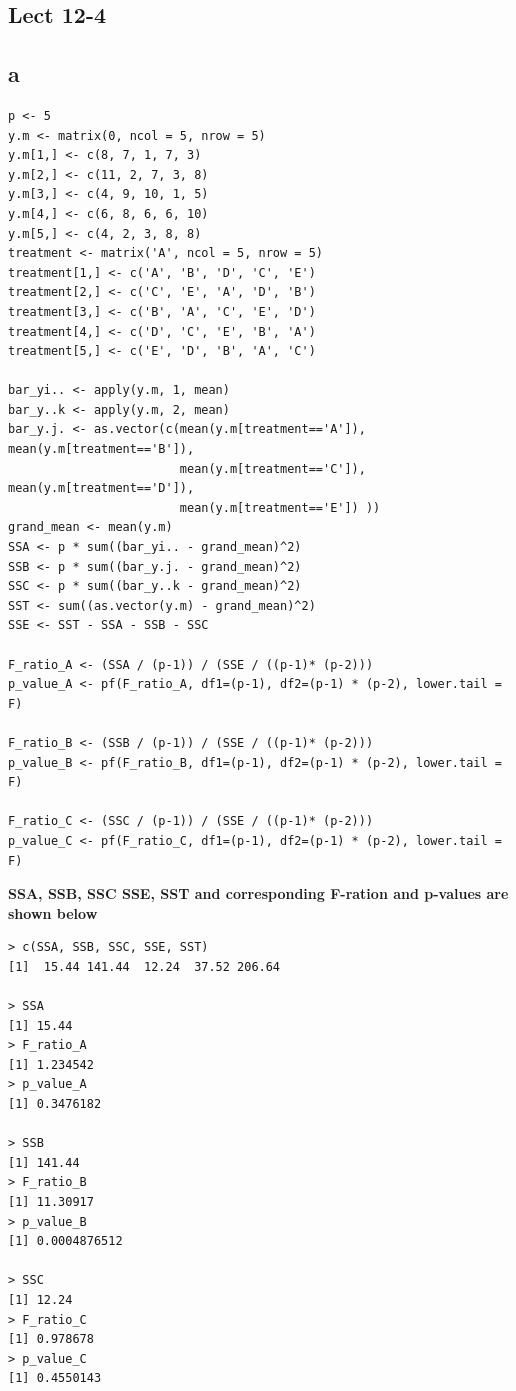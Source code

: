 \documentclass[11pt,letterpaper]{article}
\begin{document}
\subsection*{Lect 12-4}
\subsection*{a}
\begin{verbatim}
p <- 5
y.m <- matrix(0, ncol = 5, nrow = 5)
y.m[1,] <- c(8, 7, 1, 7, 3)
y.m[2,] <- c(11, 2, 7, 3, 8)
y.m[3,] <- c(4, 9, 10, 1, 5)
y.m[4,] <- c(6, 8, 6, 6, 10)
y.m[5,] <- c(4, 2, 3, 8, 8)
treatment <- matrix('A', ncol = 5, nrow = 5)
treatment[1,] <- c('A', 'B', 'D', 'C', 'E')
treatment[2,] <- c('C', 'E', 'A', 'D', 'B')
treatment[3,] <- c('B', 'A', 'C', 'E', 'D')
treatment[4,] <- c('D', 'C', 'E', 'B', 'A')
treatment[5,] <- c('E', 'D', 'B', 'A', 'C') 

bar_yi.. <- apply(y.m, 1, mean)
bar_y..k <- apply(y.m, 2, mean)
bar_y.j. <- as.vector(c(mean(y.m[treatment=='A']), mean(y.m[treatment=='B']),
                        mean(y.m[treatment=='C']), mean(y.m[treatment=='D']), 
                        mean(y.m[treatment=='E']) ))
grand_mean <- mean(y.m)
SSA <- p * sum((bar_yi.. - grand_mean)^2)
SSB <- p * sum((bar_y.j. - grand_mean)^2)
SSC <- p * sum((bar_y..k - grand_mean)^2)
SST <- sum((as.vector(y.m) - grand_mean)^2)
SSE <- SST - SSA - SSB - SSC

F_ratio_A <- (SSA / (p-1)) / (SSE / ((p-1)* (p-2)))
p_value_A <- pf(F_ratio_A, df1=(p-1), df2=(p-1) * (p-2), lower.tail = F)

F_ratio_B <- (SSB / (p-1)) / (SSE / ((p-1)* (p-2)))
p_value_B <- pf(F_ratio_B, df1=(p-1), df2=(p-1) * (p-2), lower.tail = F)

F_ratio_C <- (SSC / (p-1)) / (SSE / ((p-1)* (p-2)))
p_value_C <- pf(F_ratio_C, df1=(p-1), df2=(p-1) * (p-2), lower.tail = F)
\end{verbatim}

\noindent \textbf{SSA, SSB, SSC SSE, SST and corresponding F-ration and p-values are shown below}

\begin{verbatim}
> c(SSA, SSB, SSC, SSE, SST)
[1]  15.44 141.44  12.24  37.52 206.64

> SSA
[1] 15.44
> F_ratio_A
[1] 1.234542
> p_value_A
[1] 0.3476182

> SSB
[1] 141.44
> F_ratio_B
[1] 11.30917
> p_value_B
[1] 0.0004876512

> SSC
[1] 12.24
> F_ratio_C
[1] 0.978678
> p_value_C
[1] 0.4550143
\end{verbatim}
\end{document}
